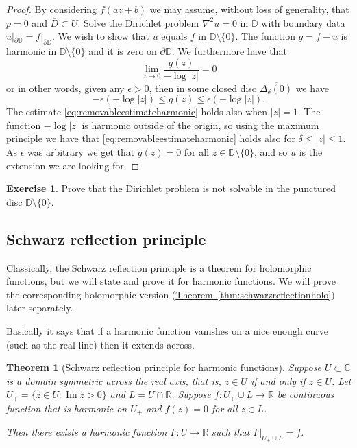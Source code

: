 \documentclass[12pt,openany]{book}
\renewcommand{\Im}{\operatorname{Im}}
\newcommand{\sabs}[1]{\lvert {#1} \rvert}
\newcommand{\C}{{\mathbb{C}}}
\newcommand{\R}{{\mathbb{R}}}
\newcommand{\D}{{\mathbb{D}}}
\theoremstyle{plain}
\newtheorem{thm}{Theorem}[section]
\theoremstyle{remark}
\theoremstyle{definition}
\newenvironment{exbox}{%
    \def\FrameCommand{\vrule width 1pt \relax\hspace {10pt}}%
    \MakeFramed {\advance \hsize -\width \FrameRestore }%
}{%
    \endMakeFramed
}
\theoremstyle{exercise}
\newtheorem{exercise}{Exercise}[section]
\theoremstyle{example}
\newcommand{\thmref}[1]{\hyperref[#1]{Theorem~\ref*{#1}}}
\begin{document}
\begin{proof}
By considering $f(a z + b)$ we may assume, without loss of generality,
that $p = 0$ and $\overline{D} \subset U$.  Solve the Dirichlet problem
$\nabla^2 u = 0$
in $\D$ with boundary data $u|_{\partial \D} = f|_{\partial \D}$.
We wish to show that $u$ equals $f$ in $\D \setminus \{0\}$.
The function
$g = f - u$ is harmonic in $\D \setminus \{ 0 \}$ and it is zero on
$\partial \D$.  We furthermore have that
\begin{equation*}
\lim_{z \to 0} \frac{g(z)}{-\log \sabs{z}} = 0
\end{equation*}
or in other words, given any $\epsilon > 0$, then
in some closed disc $\overline{\Delta_\delta(0)}$ we have
\begin{equation} \label{eq:removableestimateharmonic}
-\epsilon (- \log\sabs{z})
\leq
g(z)
\leq
\epsilon (- \log\sabs{z}) .
\end{equation}
The estimate \eqref{eq:removableestimateharmonic} holds also when
$\sabs{z}=1$.
The function $-\log\sabs{z}$ is harmonic outside of the origin, so
using the maximum principle we have that
\eqref{eq:removableestimateharmonic} holds also for $\delta \leq \sabs{z}
\leq 1$.  As $\epsilon$ was arbitrary we get that $g(z) = 0$ for all
$z \in \D \setminus \{0\}$, and so $u$ is the extension we are looking for.
\end{proof}

\begin{exbox}
\begin{exercise}
Prove that the Dirichlet problem is not solvable in the punctured disc $\D
\setminus \{ 0 \}$.
\end{exercise}
\end{exbox}

\subsection{Schwarz reflection principle}

Classically, the Schwarz reflection principle is a theorem for holomorphic
functions, but we will state and prove it for harmonic functions.
We will prove the corresponding holomorphic version
(\thmref{thm:schwarzreflectionholo}) later separately.

Basically it says that if a harmonic function vanishes on a nice enough
curve (such as the real line) then it extends across.

\begin{thm}[Schwarz reflection principle for harmonic functions]
\label{thm:schwarzreflectionharm}
Suppose $U \subset \C$ is a domain symmetric across the real axis, that is,
$z \in U$ if and only if $\bar{z} \in U$.
Let $U_+ = \{ z \in U : \Im z > 0 \}$ and $L = U \cap \R$.
Suppose $f \colon U_+ \cup L \to \R$ be continuous function that is
harmonic on $U_+$ and $f(z) = 0$ for all $z \in L$.

Then there exists a harmonic function $F \colon U \to \R$ such that
$F|_{U_+ \cup L} = f$.
\end{thm}
\end{document}
